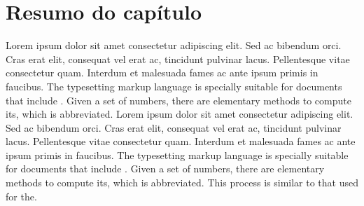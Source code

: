 \documentclass[./main.tex]{subfiles}
\begin{document}
\clearpage

\section{Resumo do capítulo} \label{sec:hydro:summary}

\par Lorem ipsum dolor sit amet consectetur adipiscing elit. Sed ac bibendum orci. Cras erat elit, consequat vel erat ac, tincidunt pulvinar lacus. Pellentesque vitae consectetur quam. Interdum et malesuada fames ac ante ipsum primis in faucibus. The typesetting markup language is specially suitable for documents that include . Given a set of numbers, there are elementary methods to compute its, which is abbreviated. Lorem ipsum dolor sit amet consectetur adipiscing elit. Sed ac bibendum orci. Cras erat elit, consequat vel erat ac, tincidunt pulvinar lacus. Pellentesque vitae consectetur quam. Interdum et malesuada fames ac ante ipsum primis in faucibus. The typesetting markup language is specially suitable for documents that include . Given a set of numbers, there are elementary methods to compute its, which is abbreviated. This process is similar to that used for the.
\end{document}
